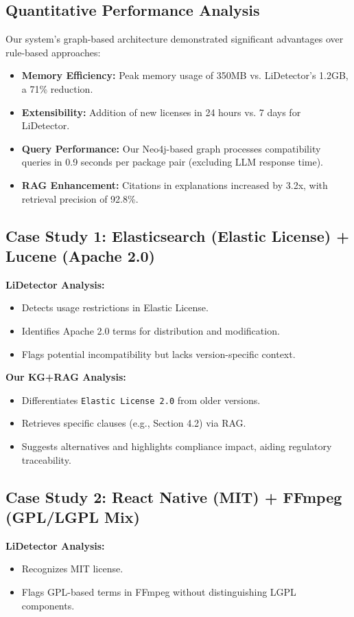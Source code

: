 \documentclass[12pt]{article}
\begin{document}
\subsection{Quantitative Performance Analysis}
Our system's graph-based architecture demonstrated significant advantages over rule-based approaches:

\begin{itemize}
    \item \textbf{Memory Efficiency:} Peak memory usage of 350MB vs. LiDetector's 1.2GB, a 71\% reduction.
    \item \textbf{Extensibility:} Addition of new licenses in 24 hours vs. 7 days for LiDetector.
    \item \textbf{Query Performance:} Our Neo4j-based graph processes compatibility queries in 0.9 seconds per package pair (excluding LLM response time).
    \item \textbf{RAG Enhancement:} Citations in explanations increased by 3.2x, with retrieval precision of 92.8\%.
\end{itemize}

\subsection{Case Study 1: Elasticsearch (Elastic License) + Lucene (Apache 2.0)}
\textbf{LiDetector Analysis:}
\begin{itemize}
    \item Detects usage restrictions in Elastic License.
    \item Identifies Apache 2.0 terms for distribution and modification.
    \item Flags potential incompatibility but lacks version-specific context.
\end{itemize}

\textbf{Our KG+RAG Analysis:}
\begin{itemize}
    \item Differentiates \texttt{Elastic License 2.0} from older versions.
    \item Retrieves specific clauses (e.g., Section 4.2) via RAG.
    \item Suggests alternatives and highlights compliance impact, aiding regulatory traceability.
\end{itemize}

\subsection{Case Study 2: React Native (MIT) + FFmpeg (GPL/LGPL Mix)}
\textbf{LiDetector Analysis:}
\begin{itemize}
    \item Recognizes MIT license.
    \item Flags GPL-based terms in FFmpeg without distinguishing LGPL components.
\end{itemize}
\end{document}
